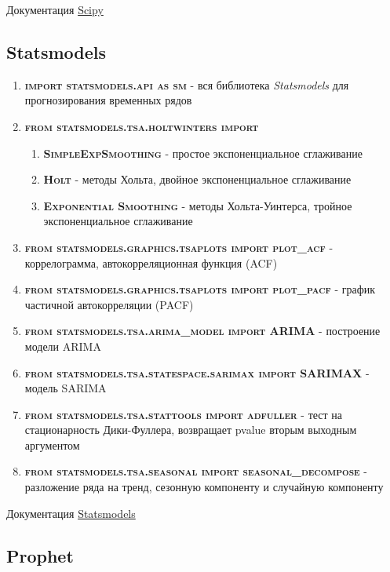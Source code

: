 \documentclass[aps,%
12pt,%
final,%
oneside,
onecolumn,%
musixtex, %
superscriptaddress,%
centertags]{article} %
\theoremstyle{plain}
\theoremstyle{definition}
\theoremstyle{remark}
\begin{document}
Документация \href{https://www.scipy.org/docs.html}{Scipy}

\newpage
\subsection{Statsmodels}

\begin{enumerate}
	\item \textbf{\textsc{import statsmodels.api as sm}} - вся библиотека \textit{Statsmodels} для прогнозирования временных рядов
	\item \textbf{\textsc{from statsmodels.tsa.holtwinters import}}
	\begin{enumerate}
		\item \textbf{\textsc{SimpleExpSmoothing}} - простое экспоненциальное сглаживание
		\item \textbf{\textsc{Holt}} - методы Хольта, двойное экспоненциальное сглаживание
		\item \textbf{\textsc{Exponential Smoothing}} - методы Хольта-Уинтерса, тройное экспоненциальное сглаживание
	\end{enumerate}
	\item \textbf{\textsc{from statsmodels.graphics.tsaplots import plot\_acf}} - коррелограмма, автокорреляционная функция (ACF)
	\item \textbf{\textsc{from statsmodels.graphics.tsaplots import plot\_pacf}} - график частичной автокорреляции (PACF)
	\item \textbf{\textsc{from statsmodels.tsa.arima\_model import ARIMA}} - построение модели ARIMA
	\item \textbf{\textsc{from statsmodels.tsa.statespace.sarimax import SARIMAX}} - модель SARIMA
	\item \textbf{\textsc{from statsmodels.tsa.stattools import adfuller}} - тест на стационарность Дики-Фуллера, возвращает pvalue вторым выходным аргументом
	\item \textbf{\textsc{from statsmodels.tsa.seasonal import seasonal\_decompose}} - разложение ряда на тренд, сезонную компоненту и случайную компоненту
\end{enumerate}

Документация \href{https://www.statsmodels.org/stable/examples/index.html}{Statsmodels}

\newpage
\subsection{Prophet}
\end{document}
